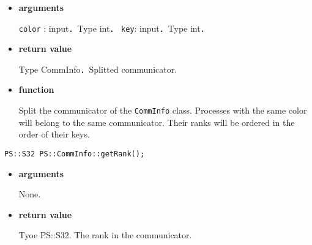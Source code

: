 \begin{itemize}

\item {\bf arguments}

{\tt color} : input．Type int．
{\tt key}: input．Type int．

\item {\bf return value}

Type CommInfo．Splitted communicator.

\item {\bf function}

Split the communicator of the {\tt CommInfo} class.
Processes with the same color will belong to the same
communicator. Their ranks will be ordered in the order of their keys.








\end{itemize}




\begin{screen}
\begin{verbatim}
PS::S32 PS::CommInfo::getRank();
\end{verbatim}
\end{screen}

\begin{itemize}

\item{{\bf arguments}}

None.

\item{{\bf return value}}

Tyoe {PS::S32}. The rank in the communicator.





\end{itemize}

